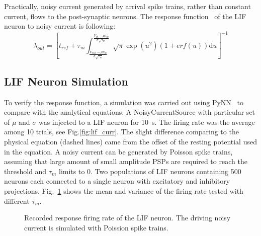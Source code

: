 \documentclass[runningheads,a4paper]{llncs}
\def\D{\mathrm{d}}
\begin{document}
Practically, noisy current generated by arrival spike trains, rather than constant current, flows to the post-synaptic neurons.
The response function~\cite{la2008response} of the LIF neuron to noisy current is following:
\begin{equation}
\lambda_\mathit{out}=
\left [ t_\mathit{ref}+\tau_m \int_{\frac{V_\mathit{rest}-\mu \tau_m }{\sigma \sqrt{\tau_m}}}^{\frac{V_{th}-\mu \tau_m }{\sigma \sqrt{\tau_m}}} \sqrt{\pi} \exp(u^{2}) (1+erf(u)) \D u \right ]^{-1}
\label{equ:noiseI}
\end{equation}

\subsection{LIF Neuron Simulation}
To verify the response function, a simulation was carried out using PyNN~\cite{davison2008pynn} to compare with the analytical equations.
A NoisyCurrentSource with particular set of $\mu$ and $\sigma$ was injected to a LIF neuron for 10~s.
The firing rate was the average among 10 trials, see Fig.\ref{fig:lif_curr}.
The slight difference comparing to the physical equation (dashed lines) came from the offset of the resting potential used in the equation.
A noisy current can be generated by Poisson spike trains, assuming that large amount of small amplitude PSPs are required to reach the threshold and $\tau_m$ limits to 0.
Two populations of LIF neurons containing 500 neurons each connected to a single neuron with excitatory and inhibitory projections. 
Fig.~\ref{fig:lif_pois} shows the mean and variance of the firing rate tested with different $\tau_m$.



\begin{figure}[bt!]
	\centering
	\caption{
	Recorded response firing rate of the LIF neuron.
	The driving noisy current is simulated with Poission spike trains.}
	\label{fig:lif_pois}	
\end{figure}
\end{document}
